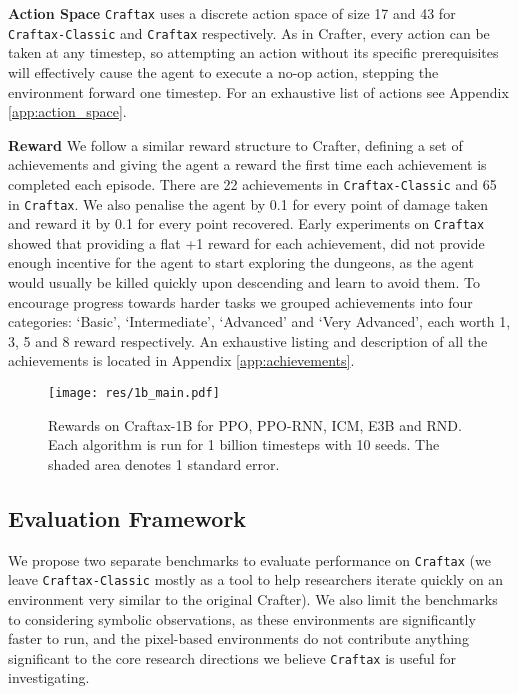 \documentclass{article}
\theoremstyle{plain}
\theoremstyle{definition}
\theoremstyle{remark}
\begin{document}
\textbf{Action Space} \texttt{Craftax} uses a discrete action space of size 17 and 43 for \texttt{Craftax-Classic} and \texttt{Craftax} respectively.  As in Crafter, every action can be taken at any timestep, so attempting an action without its specific prerequisites will effectively cause the agent to execute a no-op action, stepping the environment forward one timestep.  For an exhaustive list of actions see Appendix \ref{app:action_space}.

\textbf{Reward} We follow a similar reward structure to Crafter, defining a set of achievements and giving the agent a reward the first time each achievement is completed each episode.  There are 22 achievements in \texttt{Craftax-Classic} and 65 in \texttt{Craftax}.  We also penalise the agent by 0.1 for every point of damage taken and reward it by 0.1 for every point recovered.  Early experiments on \texttt{Craftax} showed that providing a flat +1 reward for each achievement, did not provide enough incentive for the agent to start exploring the dungeons, as the agent would usually be killed quickly upon descending and learn to avoid them.  To encourage progress towards harder tasks we grouped achievements into four categories: `Basic', `Intermediate', `Advanced' and `Very Advanced', each worth 1, 3, 5 and 8 reward respectively.  An exhaustive listing and description of all the achievements is located in Appendix \ref{app:achievements}.

\begin{figure}
    \centering
    \texttt{[image: res/1b\_main.pdf]}
    \caption{Rewards on Craftax-1B for PPO, PPO-RNN, ICM, E3B and RND.  Each algorithm is run for 1 billion timesteps with 10 seeds.  The shaded area denotes 1 standard error.}
    \label{fig:craftax_1b_return}
\end{figure}

\subsection{Evaluation Framework}

We propose two separate benchmarks to evaluate performance on \texttt{Craftax} (we leave \texttt{Craftax-Classic} mostly as a tool to help researchers iterate quickly on an environment very similar to the original Crafter).  We also limit the benchmarks to considering symbolic observations, as these environments are significantly faster to run, and the pixel-based environments do not contribute anything significant to the core research directions we believe \texttt{Craftax} is useful for investigating.
\end{document}
